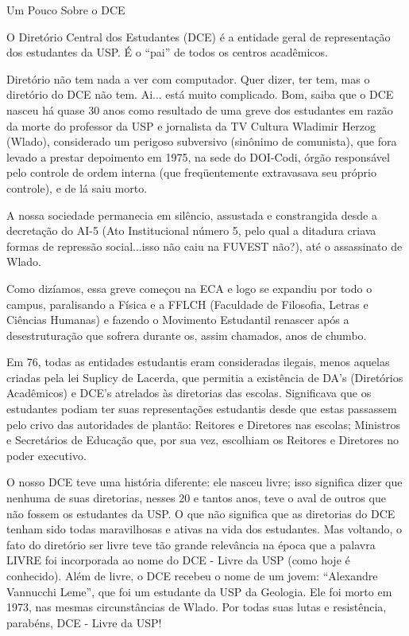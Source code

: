 \begin{secao}{Um Pouco Sobre o DCE}


O Diretório Central dos Estudantes (DCE) é a entidade geral de representação
dos estudantes da USP. É o ``pai'' de todos os centros acadêmicos.

Diretório não tem nada a ver com computador. Quer dizer, ter tem, mas o
diretório do DCE não tem. Ai... está muito complicado. Bom, saiba que o DCE
nasceu há quase 30 anos como resultado de uma greve dos estudantes em
razão da morte do professor da USP e jornalista da TV Cultura Wladimir Herzog
(Wlado), considerado um perigoso subversivo (sinônimo de comunista), que fora
levado a prestar depoimento em 1975, na sede do DOI-Codi, órgão responsável
pelo controle de ordem interna (que freqüentemente extravasava seu próprio
controle), e de lá saiu morto.

A nossa sociedade permanecia em silêncio, assustada e constrangida desde a
decretação do AI-5 (Ato Institucional número 5, pelo qual a ditadura criava
formas de repressão social...isso não caiu na FUVEST não?), até o assassinato
de Wlado.

Como dizíamos, essa greve começou na ECA e logo se expandiu por todo o  campus,
paralisando a Física e a FFLCH (Faculdade de Filosofia, Letras e Ciências
Humanas) e fazendo o Movimento Estudantil renascer após a desestruturação que
sofrera durante os, assim chamados, anos de chumbo.

Em 76, todas as entidades estudantis eram consideradas ilegais, menos aquelas
criadas pela lei Suplicy de Lacerda, que permitia a existência de DA's
(Diretórios Acadêmicos) e DCE's atrelados às diretorias das escolas.
Significava que os estudantes podiam ter suas representações estudantis desde
que estas passassem pelo crivo das autoridades de plantão: Reitores e
Diretores nas escolas; Ministros e Secretários de Educação que, por sua vez,
escolhiam os Reitores e Diretores no poder executivo.

O nosso DCE teve uma história diferente: ele nasceu livre; isso significa dizer
que nenhuma de suas diretorias, nesses 20 e tantos anos, teve o aval de outros
que não fossem os estudantes da USP. O que não significa que as diretorias do DCE
tenham sido todas maravilhosas e ativas na vida dos estudantes. 
Mas voltando, o fato do diretório ser livre teve tão grande relevância na época
que a palavra LIVRE foi incorporada ao nome do DCE - Livre da USP (como hoje é
conhecido). Além de livre, o DCE recebeu o nome de um jovem: ``Alexandre Vannucchi Leme'',
que foi um estudante da USP da Geologia. Ele foi morto em 1973, nas mesmas
circunstâncias de Wlado. Por todas suas lutas e resistência, parabéns,
DCE - Livre da USP!

\end{secao}
